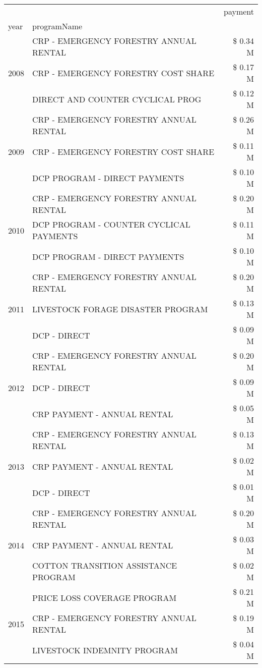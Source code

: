 \begin{tabular}{llr}
\toprule
 &  & payment \\
year & programName &  \\
\midrule
\multirow[t]{3}{*}{2008} & CRP - EMERGENCY FORESTRY ANNUAL RENTAL & \$ 0.34 M \\
 & CRP - EMERGENCY FORESTRY COST SHARE & \$ 0.17 M \\
 & DIRECT AND COUNTER CYCLICAL PROG & \$ 0.12 M \\
\cline{1-3}
\multirow[t]{3}{*}{2009} & CRP - EMERGENCY FORESTRY ANNUAL RENTAL & \$ 0.26 M \\
 & CRP - EMERGENCY FORESTRY COST SHARE & \$ 0.11 M \\
 & DCP PROGRAM - DIRECT PAYMENTS & \$ 0.10 M \\
\cline{1-3}
\multirow[t]{3}{*}{2010} & CRP - EMERGENCY FORESTRY ANNUAL RENTAL & \$ 0.20 M \\
 & DCP PROGRAM - COUNTER CYCLICAL PAYMENTS & \$ 0.11 M \\
 & DCP PROGRAM - DIRECT PAYMENTS & \$ 0.10 M \\
\cline{1-3}
\multirow[t]{3}{*}{2011} & CRP - EMERGENCY FORESTRY ANNUAL RENTAL & \$ 0.20 M \\
 & LIVESTOCK FORAGE DISASTER PROGRAM & \$ 0.13 M \\
 & DCP - DIRECT & \$ 0.09 M \\
\cline{1-3}
\multirow[t]{3}{*}{2012} & CRP - EMERGENCY FORESTRY ANNUAL RENTAL & \$ 0.20 M \\
 & DCP - DIRECT & \$ 0.09 M \\
 & CRP PAYMENT - ANNUAL RENTAL & \$ 0.05 M \\
\cline{1-3}
\multirow[t]{3}{*}{2013} & CRP - EMERGENCY FORESTRY ANNUAL RENTAL & \$ 0.13 M \\
 & CRP PAYMENT - ANNUAL RENTAL & \$ 0.02 M \\
 & DCP - DIRECT & \$ 0.01 M \\
\cline{1-3}
\multirow[t]{3}{*}{2014} & CRP - EMERGENCY FORESTRY ANNUAL RENTAL & \$ 0.20 M \\
 & CRP PAYMENT - ANNUAL RENTAL & \$ 0.03 M \\
 & COTTON TRANSITION ASSISTANCE PROGRAM & \$ 0.02 M \\
\cline{1-3}
\multirow[t]{3}{*}{2015} & PRICE LOSS COVERAGE PROGRAM & \$ 0.21 M \\
 & CRP - EMERGENCY FORESTRY ANNUAL RENTAL & \$ 0.19 M \\
 & LIVESTOCK INDEMNITY PROGRAM & \$ 0.04 M \\

\end{tabular}
